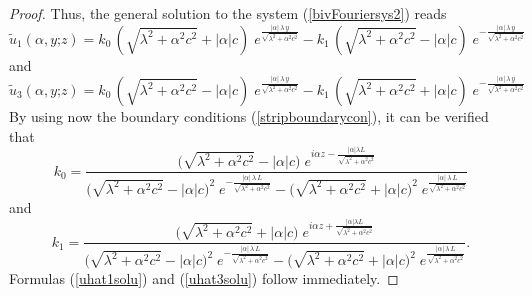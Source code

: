 \documentclass[10pt,a4paper]{amsart}
\begin{document}
\begin{proof}
Thus, the general solution to the system (\ref{bivFouriersys2}) reads
$$\widetilde{u}_1(\alpha,y\mathord{;}z)=k_0\,(\sqrt{\lambda^2+\alpha^2c^2}+\lvert\alpha\lvert c)\;e^{\frac{\lvert\alpha\lvert\,\lambda\,y}{\sqrt{\lambda^2+\alpha^2c^2}}}-k_1\,(\sqrt{\lambda^2+\alpha^2c^2}-\lvert\alpha\lvert c)\;e^{-\frac{\lvert\alpha\lvert\,\lambda\,y}{\sqrt{\lambda^2+\alpha^2c^2}}}$$
and
$$\widetilde{u}_3(\alpha,y\mathord{;}z)=k_0\,(\sqrt{\lambda^2+\alpha^2c^2}-\lvert\alpha\lvert c)\;e^{\frac{\lvert\alpha\lvert\,\lambda\,y}{\sqrt{\lambda^2+\alpha^2c^2}}}-k_1\,(\sqrt{\lambda^2+\alpha^2c^2}+\lvert\alpha\lvert c)\;e^{-\frac{\lvert\alpha\lvert\,\lambda\,y}{\sqrt{\lambda^2+\alpha^2c^2}}}$$
By using now the boundary conditions (\ref{stripboundarycon}), it can be verified that
$$k_0=\frac{\big(\sqrt{\lambda^2+\alpha^2c^2}-\lvert\alpha\lvert c\big)\;e^{i\alpha z-\frac{\lvert\alpha\lvert\lambda L}{\sqrt{\lambda^2+\alpha^2c^2}}}}{\big(\sqrt{\lambda^2+\alpha^2c^2}-\lvert\alpha\lvert c\big)^2\;e^{-\frac{\lvert\alpha\lvert\,\lambda\,L}{\sqrt{\lambda^2+\alpha^2c^2}}}-\big(\sqrt{\lambda^2+\alpha^2c^2}+\lvert\alpha\lvert c\big)^2\;e^{\frac{\lvert\alpha\lvert\,\lambda\,L}{\sqrt{\lambda^2+\alpha^2c^2}}}}$$
and
$$k_1=\frac{\big(\sqrt{\lambda^2+\alpha^2c^2}+\lvert\alpha\lvert c\big)\;e^{i\alpha z+\frac{\lvert\alpha\lvert\lambda L}{\sqrt{\lambda^2+\alpha^2c^2}}}}{\big(\sqrt{\lambda^2+\alpha^2c^2}-\lvert\alpha\lvert c\big)^2\;e^{-\frac{\lvert\alpha\lvert\,\lambda\,L}{\sqrt{\lambda^2+\alpha^2c^2}}}-\big(\sqrt{\lambda^2+\alpha^2c^2}+\lvert\alpha\lvert c\big)^2\;e^{\frac{\lvert\alpha\lvert\,\lambda\,L}{\sqrt{\lambda^2+\alpha^2c^2}}}}.$$
Formulas (\ref{uhat1solu}) and (\ref{uhat3solu}) follow immediately.
\end{proof}
\end{document}
